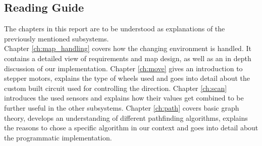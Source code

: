 \subsection*{Reading Guide}
The chapters in this report are to be understood as explanations of the previously mentioned subsystems.\\
Chapter \ref{ch:map_handling} covers how the changing environment is handled.
It contains a detailed view of requirements and map design,
as well as an in depth discussion of our implementation.
Chapter \ref{ch:move} gives an introduction to stepper motors, explains the type of wheels used and goes into detail about the custom built circuit used for controlling the direction.
Chapter \ref{ch:scan} introduces the used sensors and 
explains how their values get combined to be further useful in the other subsystems.
Chapter \ref{ch:path} covers basic graph theory,
develops an understanding of different pathfinding algorithms,
explains the reasons to chose a specific algorithm in our context and
goes into detail about the programmatic implementation.


